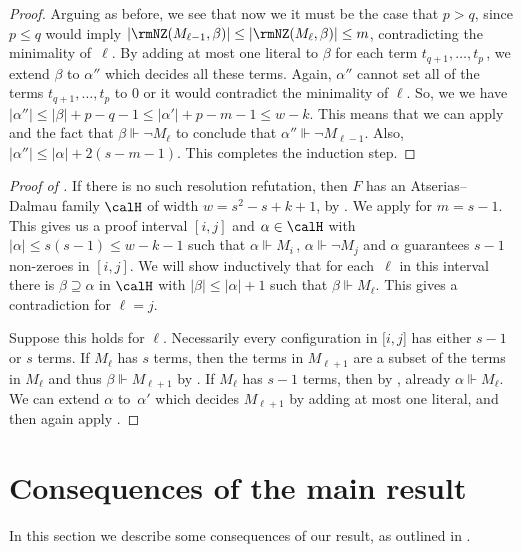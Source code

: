 \documentclass{toc}
\begin{document}
\begin{proof}
Arguing as before, we see that now we it must be the case that $p>q$,
since $p \le q$ would imply $|\rmNZ(M_{\ell-1}, \beta)| \le |\rmNZ(M_\ell, \beta)| \le m$, contradicting the minimality of~$\ell$.
By adding at most one literal to $\beta$ for each term $t_{q+1}, \dots, t_p$\,, 
we extend $\beta$ to $\alpha''$ which decides all these terms. Again,
$\alpha''$ cannot set all of the terms $t_{q+1}, \dots, t_p$ 
to $0$ or it would contradict the minimality of $\ell$.
So, we we have $|\alpha''| \le |\beta| + p-q-1 \le |\alpha'|+p-m-1
\le w-k$.
This means that we can apply  
and the fact that $\beta \Vdash \neg M_\ell$ to conclude that $\alpha'' \Vdash \neg M_{\ell-1}$.
Also, $|\alpha''| \le |\alpha|+2(s-m-1)$. This completes the induction step.
\end{proof}

\begin{proof}[Proof of ]
If there is no such resolution refutation, then $F$ has an Atserias--Dalmau
family $\calH$ of width $w=s^2-s+k+1$, by .
We apply  for $m=s-1$. 
This gives us 
a proof interval $[i, j]$
and $\alpha \in \calH$
with $|\alpha| \le s(s-1) \le w-k-1$ such that
$\alpha \Vdash M_i$\,, $\alpha \Vdash \neg M_j$
and $\alpha$ guarantees $s-1$ non-zeroes in $[i,j]$. 
We will show inductively that for each~$\ell$ in this interval
there is $\beta \supseteq \alpha$ in $\calH$ with $|\beta| \le |\alpha|+1$
such that
$\beta \Vdash M_{\ell}$. This gives a contradiction for $\ell = j$.

Suppose this holds for $\ell$. Necessarily every
configuration in $[i,j$] has either $s-1$ or $s$ terms.
 If $M_{\ell}$ has $s$ terms, then the terms
in $M_{\ell+1}$ are a subset of the terms in $M_{\ell}$ and
thus $\beta \Vdash M_{\ell+1}$ by 
.
If $M_{\ell}$ has $s-1$ terms, then by 
, already $\alpha \Vdash M_{\ell}$.
We can extend $\alpha$ to~$\alpha'$ which decides $M_{\ell+1}$
by adding at most one literal, and then again apply
.
\end{proof}




%
\section{Consequences of the main result}\label{sec:conseq}
%


In this section we describe some consequences of our result,
as outlined in .
 
\end{document}
